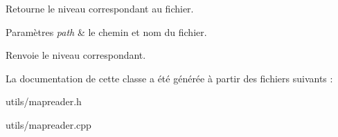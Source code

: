 Retourne le niveau correspondant au fichier. 


\begin{DoxyParams}{Paramètres}
{\em path} & le chemin et nom du fichier. \\
\hline
\end{DoxyParams}
\begin{DoxyReturn}{Renvoie}
le niveau correspondant. 
\end{DoxyReturn}


La documentation de cette classe a été générée à partir des fichiers suivants \+:\begin{DoxyCompactItemize}
\item 
utils/mapreader.\+h\item 
utils/mapreader.\+cpp\end{DoxyCompactItemize}
